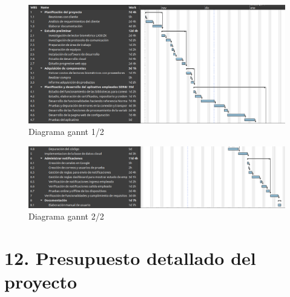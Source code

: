 \documentclass[
11pt, %
]{charter}
\begin{document}
\begin{figure}[htpb]
\centering 
\includegraphics[width=1\textwidth]{./Figuras/ganntParte1.png}
\caption{Diagrama gannt 1/2}
\label{fig:AoN}
\end{figure}

\begin{figure}[htpb]
\centering 
\includegraphics[width=1\textwidth]{./Figuras/ganntParte2.png}
\caption{Diagrama gannt 2/2}
\label{fig:AoN}
\end{figure}


\section{12. Presupuesto detallado del proyecto}
\label{sec:presupuesto}
\end{document}
